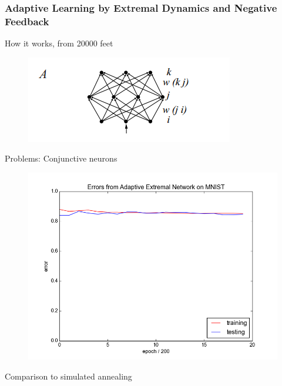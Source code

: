 \documentclass{beamer}
\begin{document}
\begin{frame}
  \frametitle{Adaptive Learning by Extremal Dynamics and Negative Feedback}
  How it works, from 20000 feet
  \begin{figure}
    \includegraphics{bak_chialvo_net_topology}
  \end{figure}

  Problems: Conjunctive neurons
  \begin{figure}
    \includegraphics{bak_plot}
  \end{figure}
  
  Comparison to simulated annealing
\end{frame}
\end{document}
